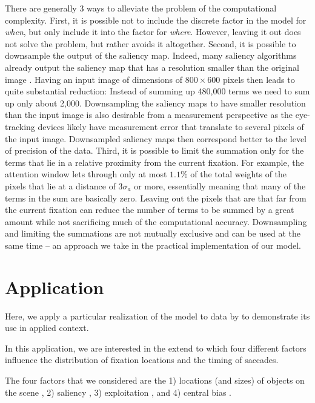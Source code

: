 \documentclass{article}
\begin{document}
There are generally 3 ways to alleviate the problem of the computational complexity. First, it is possible not to include the discrete factor in the model for \textit{when}, but only include it into the factor for \textit{where}. However, leaving it out does not solve the problem, but rather avoids it altogether. Second, it is possible to downsample the output of the saliency map. Indeed, many saliency algorithms already output the saliency map that has a resolution smaller than the original image \citep[e.g., by a factor of $16$ in each of the dimensions,][] {itti1998model}. Having an input image of dimensions of $800\times600$ pixels then leads to quite substantial reduction: Instead of summing up 480,000 terms we need to sum up only about 2,000. Downsampling the saliency maps to have smaller resolution than the input image is also desirable from a measurement perspective as the eye-tracking devices likely have measurement error that translate to several pixels of the input image.  Downsampled saliency maps then correspond better to the level of precision of the data. Third, it is possible to limit the summation only for the terms that lie in a relative proximity from the current fixation. For example, the attention window lets through only at most $1.1\%$ of the total weights of the pixels that lie at a distance of $3\sigma_a$ or more, essentially meaning that many of the terms in the sum are basically zero. Leaving out the pixels that are that far from the current fixation can reduce the number of terms to be summed by a great amount while not sacrificing much of the computational accuracy. Downsampling and limiting the summations are not mutually exclusive and can be used at the same time -- an approach we take in the practical implementation of our model.



\section{Application}

Here, we apply a particular realization of the model to data by \citet{renswoude2019object_familiarity} to demonstrate its use in applied context.

In this application, we are interested in the extend to which four different factors influence the distribution of fixation locations and the timing of saccades. 

The four factors that we considered are the 1) locations (and sizes) of objects on the scene \citep{xu2014beyond,renswoude2019object_familiarity}, 2) saliency \citep{itti1998model,itti2000saliency,itti2001computational}, 3) exploitation \citep[i.e., tendency to make repeated fixations in a relative proximity to previous fixation;][]{malem2020exploration}, and 4) central bias \citep{renswoude2019central}. 
\end{document}
